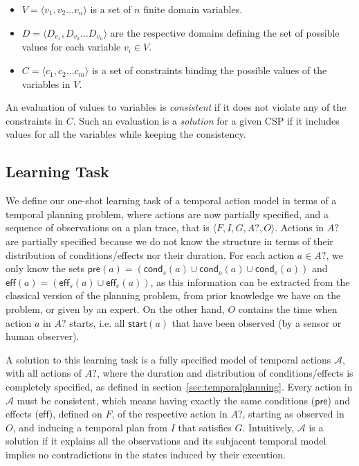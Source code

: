 \documentclass[runningheads]{llncs}
\newcommand{\tup}[1]{{\langle #1 \rangle}}
\newcommand{\pre}{\mathsf{pre}}    %
\newcommand{\eff}{\mathsf{eff}}    %
\newcommand{\cond}{\mathsf{cond}}  %
\newcommand{\start}{\mathsf{start}}%
\begin{document}
\begin{itemize}

\item $V=\tup{v_1,v_2 \ldots v_n}$ is a set of $n$ finite domain variables.

\item $D=\tup{D_{v_1},D_{v_2} \ldots D_{v_n}}$ are the respective domains defining the set of possible values for each variable $v_i \in V$.

\item $C=\tup{c_1,c_2 \ldots c_m}$ is a set of constraints binding the possible values of the variables in $V$.

\end{itemize}

An evaluation of values to variables is {\em consistent} if it does not violate any of the constraints in $C$. Such an evaluation is a {\em solution} for a given CSP if it includes values for all the variables while keeping the consistency.




\subsection{Learning Task}
\label{sec:learningtask}


We define our one-shot learning task of a temporal action model in terms of a temporal planning problem, where actions are now partially specified, and a sequence of observations on a plan trace, that is $\tup{F,I,G,A?,O}$. Actions in $A?$ are partially specified because we do not know the structure in terms of their distribution of conditions/effects nor their duration. For each action $a \in A?$, we only know the sets $\pre(a)=(\cond_s(a) \cup \cond_o(a) \cup \cond_e(a))$ and $\eff(a)=(\eff_s(a) \cup \eff_e(a))$, as this information can be extracted from the classical version of the planning problem, from prior knowledge we have on the problem, or given by an expert. On the other hand, $O$ contains the time when action $a$ in $A?$ starts, i.e. all $\start(a)$ that have been observed (by a sensor or human observer).


A solution to this learning task is a fully specified model of temporal actions $\mathcal{A}$, with all actions of $A?$, where the duration and distribution of conditions/effects is completely specified, as defined in section~\ref{sec:temporalplanning}. Every action in $\mathcal{A}$ must be consistent, which means having exactly the same conditions ($\pre$) and effects ($\eff$), defined on $F$, of the respective action in $A?$, starting as observed in $O$, and inducing a temporal plan from $I$ that satisfies $G$. Intuitively, $\mathcal{A}$ is a solution if it explains all the observations and its subjacent temporal model implies no contradictions in the states induced by their execution.
\end{document}
